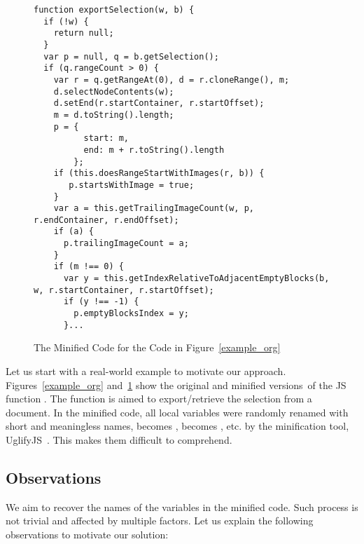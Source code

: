 \begin{figure}[t]
	\centering
	\begin{lstlisting}[]
function exportSelection(w, b) {
  if (!w) {
    return null;
  }
  var p = null, q = b.getSelection();
  if (q.rangeCount > 0) {
    var r = q.getRangeAt(0), d = r.cloneRange(), m;
    d.selectNodeContents(w);
    d.setEnd(r.startContainer, r.startOffset);
    m = d.toString().length;
    p = {
          start: m,
          end: m + r.toString().length
        };
    if (this.doesRangeStartWithImages(r, b)) {
       p.startsWithImage = true;
    }
    var a = this.getTrailingImageCount(w, p, r.endContainer, r.endOffset);
    if (a) {
      p.trailingImageCount = a;
    }
    if (m !== 0) {
      var y = this.getIndexRelativeToAdjacentEmptyBlocks(b, w, r.startContainer, r.startOffset);
      if (y !== -1) {
        p.emptyBlocksIndex = y;
      }...
\end{lstlisting}
\vspace{-12pt}
\caption{The Minified Code for the Code in Figure~\ref{example_org}}
\label{example_sim}
\end{figure}

Let us start with a real-world example to motivate our approach.
Figures~\ref{example_org} and~\ref{example_sim} show the original and
minified versions~of the JS function .  The
function is aimed to export/retrieve the selection from a document.
%
In the minified code, all local variables were randomly renamed with
short and meaningless names, \eg {} becomes ,
 becomes , etc. by the minification tool,
\eg UglifyJS~\cite{uglifyJS}. This makes them difficult to
comprehend.


\subsection{Observations}

We aim to recover the names of the variables in the minified
code. Such process is not trivial and affected by multiple factors.
Let us explain the following observations to motivate our solution:

